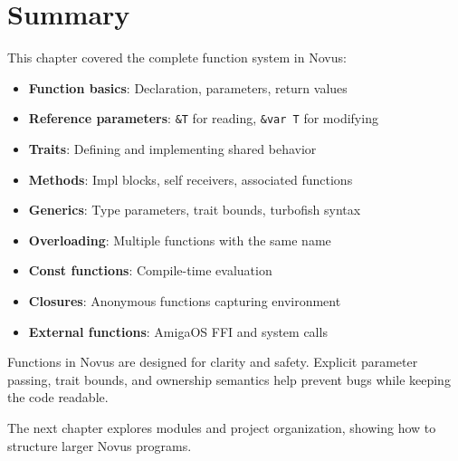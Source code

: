 \section{Summary}
\label{sec:fn-summary}

This chapter covered the complete function system in Novus:

\begin{itemize}
    \item \textbf{Function basics}: Declaration, parameters, return values
    \item \textbf{Reference parameters}: \texttt{\&T} for reading, \texttt{\&var T} for modifying
    \item \textbf{Traits}: Defining and implementing shared behavior
    \item \textbf{Methods}: Impl blocks, self receivers, associated functions
    \item \textbf{Generics}: Type parameters, trait bounds, turbofish syntax
    \item \textbf{Overloading}: Multiple functions with the same name
    \item \textbf{Const functions}: Compile-time evaluation
    \item \textbf{Closures}: Anonymous functions capturing environment
    \item \textbf{External functions}: AmigaOS FFI and system calls
\end{itemize}

Functions in Novus are designed for clarity and safety. Explicit parameter passing, trait bounds, and ownership semantics help prevent bugs while keeping the code readable.

The next chapter explores modules and project organization, showing how to structure larger Novus programs.
